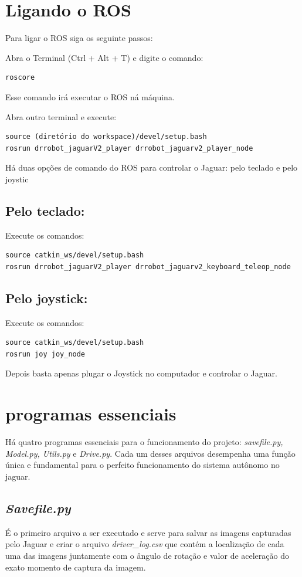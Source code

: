\section{Ligando o ROS}
Para ligar o ROS siga os seguinte passos:

Abra o Terminal (Ctrl + Alt + T) e digite o comando:
\begin{lstlisting}
roscore
\end{lstlisting}
Esse comando irá executar o ROS ná máquina.

Abra outro terminal e execute:
\begin{lstlisting}
source (diretório do workspace)/devel/setup.bash
rosrun drrobot_jaguarV2_player drrobot_jaguarv2_player_node 
\end{lstlisting}
Há duas opções de comando do ROS para controlar o Jaguar: pelo teclado e pelo joystic

\subsection{Pelo teclado:}
Execute os comandos:
\begin{lstlisting}
source catkin_ws/devel/setup.bash
rosrun drrobot_jaguarV2_player drrobot_jaguarv2_keyboard_teleop_node
\end{lstlisting}

\subsection{Pelo joystick:}

Execute os comandos:
\begin{lstlisting}
source catkin_ws/devel/setup.bash
rosrun joy joy_node
\end{lstlisting}
Depois basta apenas plugar o Joystick no computador e controlar o Jaguar.

\section{programas essenciais}
\label{sec:programas essenciais}
Há quatro programas essenciais para o funcionamento do projeto: \textit{savefile.py, Model.py, Utils.py} e \textit{Drive.py}. Cada um desses arquivos desempenha uma função única e fundamental para o perfeito funcionamento do sistema autônomo no jaguar.

\subsection{\textit{Savefile.py}}
\label{sec:Savefile.py}
É o primeiro arquivo a ser executado e serve para salvar as imagens capturadas pelo Jaguar e criar o arquivo \textit{driver\_log.csv} que contém a localização de cada uma das imagens juntamente com o ângulo de rotação e valor de aceleração do exato momento de captura da imagem. 


